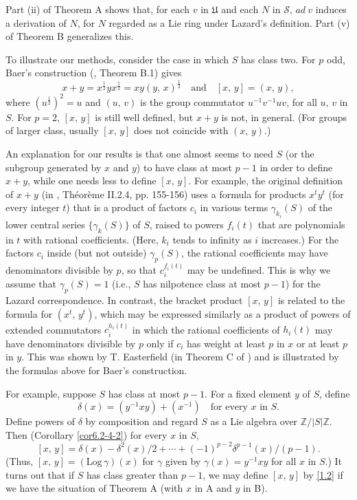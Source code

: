 \documentclass[mathscr]{amsart}
\theoremstyle{theorem}
\theoremstyle{definition}
\numberwithin{equation}{section}
\def \({\left(}
\def \){\right)}
\def\Z{\mathbb{Z}}
\def\S{\mathcal{S}}
\def \Log{\text{Log}\,}
\begin{document}
Part (ii) of Theorem A shows that, for each $v$ in $\mathfrak U$ and
each $N$ in $\S$, $ad\ v$ induces a derivation of $N$, for $N$
regarded as a Lie ring under Lazard's definition. Part (v) of
Theorem B generalizes this.

To illustrate our methods, consider the case in which $S$ has class
two. For $p$ odd, Baer's construction (\cite{Baer}, Theorem B.1)
gives
$$x+y=x^{\frac12}yx^{\frac12}=xy\(y,\,x\)^{\frac12}\quad\text{and}\quad[x,\,y]=(x,\,y),$$
where $\(u^\frac12\)^2=u$ and $(u,\,v)$ is the group commutator
$u^{-1}v^{-1}uv$, for all $u,\,v$ in $S$. For $p=2$, $[x,\,y]$ is
still well defined, but $x+y$ is not, in general. (For groups of
larger class, usually $[x,\,y]$ does not coincide with $(x,\,y)$.)

An explanation for our results is that one almost seems to need $S$
(or the subgroup generated by $x$ and $y$) to have class at most
$p-1$ in order to define $x+y$, while one needs less to define
$[x,\,y]$. For example, the original definition of $x+y$ (in
\cite{Lazard}, Th\'eor\`eme II.2.4, pp. 155-156) uses a formula for
products $x^ty^t$ (for every integer $t$) that is a product of
factors $c_i$ in various terms $\gamma_{k_i}(S)$ of the lower
central series $\{\gamma_k(S)\}$ of $S$, raised to powers $f_i(t)$
that are polynomials in $t$ with rational coefficients. (Here, $k_i$
tends to infinity as $i$ increases.) For the factors $c_i$ inside
(but not outside) $\gamma_p(S)$, the rational coefficients may have
denominators divisible by $p$, so that $c_i^{f_i(t)}$ may be
undefined. This is why we assume that $\gamma_p(S)=1$ (i.e., $S$ has
nilpotence class at most $p-1$) for the Lazard correspondence. In
contrast, the bracket product $[x,\,y]$ is related to the formula
for $\(x^t,\,y^t\)$, which may be expressed similarly as a product
of powers of  extended commutators $c_i^{h_i(t)}$ in which the
rational coefficients of $h_i(t)$ may have denominators divisible by
$p$ only if $c_i$ has weight at least $p$ in $x$ or at least $p$ in
$y$. This was shown by T. Easterfield (in Theorem C of \cite{East})
and is illustrated by the formulas above for Baer's construction.

For example, suppose $S$ has class at most $p-1$. For a fixed
element $y$ of $S$, define
$$\delta(x)=\(y^{-1}xy\)+\(x^{-1}\)\quad\text{for every $x$ in $S$.}$$
Define powers of $\delta$ by composition and regard $S$ as a Lie
algebra over $\Z/|S|\Z$. Then (Corollary \ref{cor6.2-4-2}) for every
$x$ in $S$,
\begin{equation}\label{1.2}
[x,\,y]=\delta(x)-\delta^2(x)/2+\cdots+(-1)^{p-2}\delta^{p-1}(x)/(p-1).
\end{equation}
(Thus, $[x,\,y]=\(\Log\gamma\)(x)$ for $\gamma$ given by
$\gamma(x)=y^{-1}xy$ for all $x$ in $S$.) It turns out that if $S$
has class greater than $p-1$, we may define $[x,\,y]$ by \eqref{1.2}
if we have the situation of Theorem A (with $x$ in A and $y$ in B).
\end{document}
